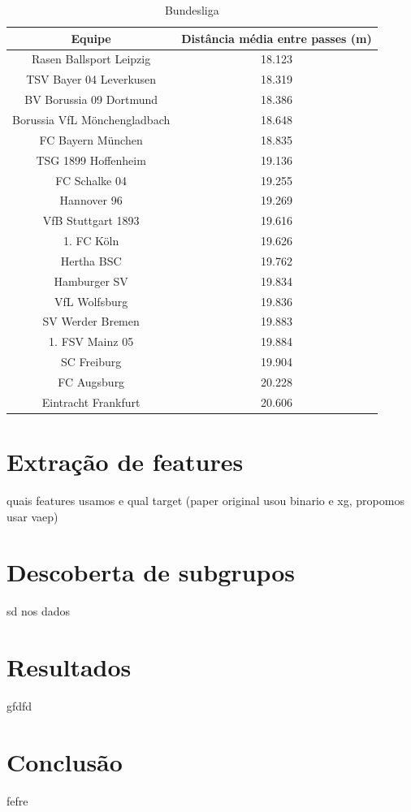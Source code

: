 \documentclass{article}
\begin{document}
\begin{table}[H]
	\centering
	\begin{tabular}{|c|c|}
		\hline
		\textbf{Equipe}              & \textbf{Distância média entre passes
		(m)}                                                                \\
		\hline
		Rasen Ballsport Leipzig      & 18.123
		\\ \hline
		TSV Bayer 04 Leverkusen      & 18.319
		\\ \hline
		BV Borussia 09 Dortmund      & 18.386
		\\ \hline
		Borussia VfL Mönchengladbach & 18.648
		\\ \hline
		FC Bayern München            & 18.835
		\\ \hline
		TSG 1899 Hoffenheim          & 19.136
		\\ \hline
		FC Schalke 04                & 19.255
		\\ \hline
		Hannover 96                  & 19.269
		\\ \hline
		VfB Stuttgart 1893           & 19.616
		\\ \hline
		1. FC Köln                   & 19.626
		\\ \hline
		Hertha BSC                   & 19.762
		\\ \hline
		Hamburger SV                 & 19.834
		\\ \hline
		VfL Wolfsburg                & 19.836
		\\ \hline
		SV Werder Bremen             & 19.883
		\\ \hline
		1. FSV Mainz 05              & 19.884
		\\ \hline
		SC Freiburg                  & 19.904
		\\ \hline
		FC Augsburg                  & 20.228
		\\ \hline
		Eintracht Frankfurt          & 20.606
		\\ \hline
	\end{tabular}
	\caption{Bundesliga}
	\label{tab:average_distance_germany}
\end{table}

\section{Extração de features}

quais features usamos e qual target (paper original usou binario e xg, propomos usar vaep)

\section{Descoberta de subgrupos}

sd nos dados

\section{Resultados}

gfdfd

\section{Conclusão}

fefre

\newpage

\renewcommand{\refname}{Referências Bibliográficas}

\nocite{*}
\end{document}
